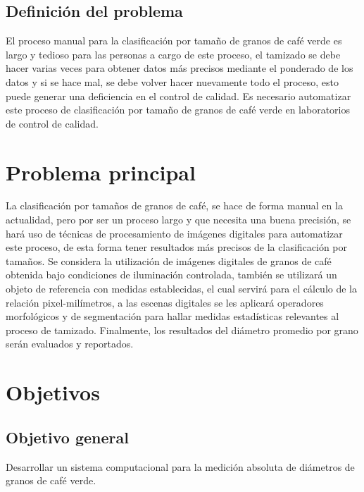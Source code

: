 \subsection{Definición del problema}
El proceso manual para la clasificación por tamaño de granos de café verde es largo y tedioso para las personas a cargo de este proceso, el tamizado se debe hacer varias veces para obtener datos más precisos mediante el ponderado de los datos y si se hace mal, se debe volver hacer nuevamente todo el proceso, esto puede generar una deficiencia en el control de calidad. Es necesario automatizar este proceso de clasificación por tamaño de granos de café verde en laboratorios de control de calidad.


\section{Problema principal}
La clasificación por tamaños de granos de café, se hace de forma manual en la actualidad, pero por ser un proceso largo y que necesita una buena precisión, se hará uso de técnicas de procesamiento de imágenes digitales para automatizar este proceso, de esta forma tener resultados más precisos de la clasificación por tamaños. Se considera la utilización de imágenes digitales de granos de café obtenida bajo condiciones de iluminación controlada, también se utilizará un objeto de referencia con medidas establecidas, el cual servirá para el cálculo de la relación pixel-milímetros, a las escenas digitales se les aplicará operadores morfológicos y de segmentación para hallar medidas estadísticas relevantes al proceso de tamizado. Finalmente, los resultados del diámetro promedio por grano serán evaluados y reportados.


\section{Objetivos}
\label{section:objectives}

\subsection{Objetivo general}
Desarrollar un sistema computacional para la medición absoluta de diámetros de granos de café verde.

